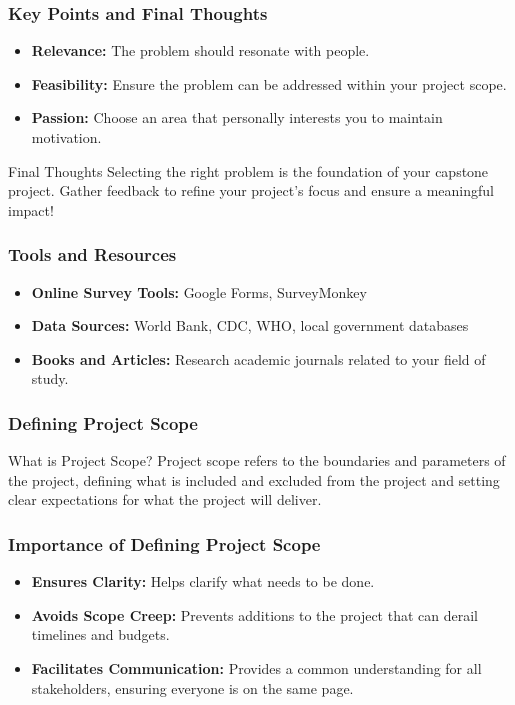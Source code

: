 \documentclass{beamer}
\begin{document}
\begin{frame}[fragile]
    \frametitle{Key Points and Final Thoughts}
    \begin{itemize}
        \item \textbf{Relevance:} The problem should resonate with people.
        \item \textbf{Feasibility:} Ensure the problem can be addressed within your project scope.
        \item \textbf{Passion:} Choose an area that personally interests you to maintain motivation.
    \end{itemize}
    
    \begin{block}{Final Thoughts}
        Selecting the right problem is the foundation of your capstone project. Gather feedback to refine your project's focus and ensure a meaningful impact!
    \end{block}
\end{frame}

\begin{frame}[fragile]
    \frametitle{Tools and Resources}
    \begin{itemize}
        \item \textbf{Online Survey Tools:} Google Forms, SurveyMonkey
        \item \textbf{Data Sources:} World Bank, CDC, WHO, local government databases
        \item \textbf{Books and Articles:} Research academic journals related to your field of study.
    \end{itemize}
\end{frame}

\begin{frame}[fragile]
    \frametitle{Defining Project Scope}
    \begin{block}{What is Project Scope?}
        Project scope refers to the boundaries and parameters of the project, defining what is included and excluded from the project and setting clear expectations for what the project will deliver.
    \end{block}
\end{frame}

\begin{frame}[fragile]
    \frametitle{Importance of Defining Project Scope}
    \begin{itemize}
        \item \textbf{Ensures Clarity:} Helps clarify what needs to be done.
        \item \textbf{Avoids Scope Creep:} Prevents additions to the project that can derail timelines and budgets.
        \item \textbf{Facilitates Communication:} Provides a common understanding for all stakeholders, ensuring everyone is on the same page.
    \end{itemize}
\end{frame}
\end{document}
